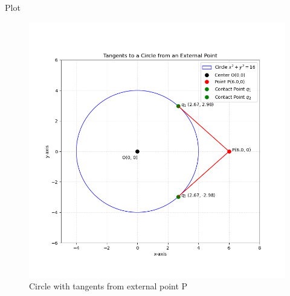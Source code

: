 \documentclass{beamer}
\begin{document}
	
	
	\begin{frame}{Plot}
		\begin{figure}[H]
			\centering
			\includegraphics[width=0.85\linewidth]{figs/tangents_plot}
			\caption{Circle with tangents from external point P}
			\label{fig:tangentsplot}
		\end{figure}
	\end{frame}
	
\end{document}
